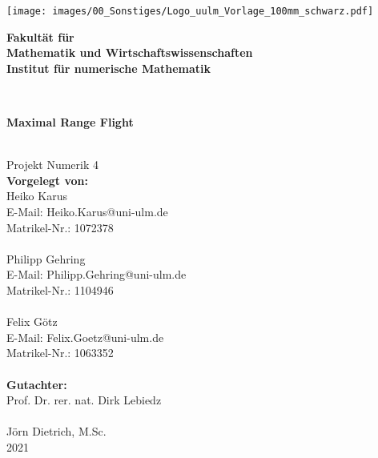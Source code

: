 \documentclass[
a4paper,
11pt,
headsepline,           %
oneside,               %
numbers=noenddot,	   %
bibliography=totoc,    %
]{scrbook}
\makeatletter
\newcommand{\Heiko}{Heiko Karus}
\newcommand{\Philipp}{Philipp Gehring}
\newcommand{\Felix}{Felix Götz}
\newcommand{\Hemail}{Heiko.Karus@uni-ulm.de}
\newcommand{\Pemail}{Philipp.Gehring@uni-ulm.de}
\newcommand{\Femail}{Felix.Goetz@uni-ulm.de}
\newcommand{\Hmatnr}{1072378}
\newcommand{\Pmatnr}{1104946}
\newcommand{\Fmatnr}{1063352}
\newcommand{\titel}{Maximal Range Flight}
\newcommand{\jahr}{2021}
\newcommand{\gutachterA}{Prof. Dr. rer. nat. Dirk Lebiedz}
\newcommand{\gutachterB}{Jörn Dietrich, M.Sc.}
\newcommand{\fakultaet}{Mathematik und Wirtschaftswissenschaften}
\newcommand{\institut}{Institut für numerische Mathematik}
\makeatother
\begin{document}

\frontmatter

\thispagestyle{empty}
\begin{addmargin*}[4mm]{-10mm}

\hfill
\texttt{[image: images/00\_Sonstiges/Logo\_uulm\_Vorlage\_100mm\_schwarz.pdf]}\\[2em]



{\footnotesize
\hspace*{130mm}\parbox[t]{35mm}{
\bfseries Fakultät für\\
\fakultaet\\
\mdseries \institut
}\\[2cm]

\parbox{140mm}{\bfseries \LARGE \titel}\\[2.5em]
{\footnotesize Projekt Numerik 4}\\[2em]

{\footnotesize \bfseries Vorgelegt von:}\\
{\footnotesize \Heiko \\ E-Mail: \Hemail \\ Matrikel-Nr.: \Hmatnr}\\ \\%
{\footnotesize \Philipp \\ E-Mail: \Pemail \\ Matrikel-Nr.: \Pmatnr}\\ \\%
{\footnotesize \Felix \\ E-Mail: \Femail \\ Matrikel-Nr.: \Fmatnr}\\ \\[2em]

{\footnotesize \bfseries Gutachter:}\\                     
{\footnotesize \gutachterA}\\ \\%
{\footnotesize \gutachterB}\\[2em]

{\footnotesize \jahr}
}
\end{addmargin*}
\end{document}
